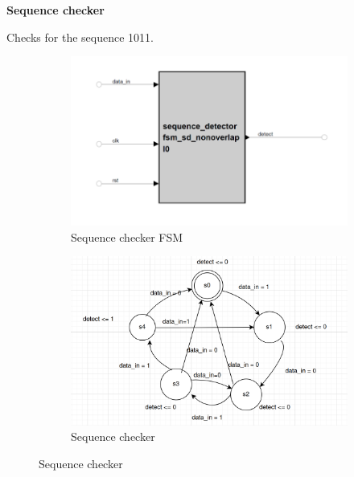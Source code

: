 \textbf{Sequence checker}

Checks for the sequence 1011.


\begin{figure}
	\centering

	\begin{subfigure}[b]{0.4\textwidth}
		\includegraphics[width=\textwidth]{images/sequence_detector.png}
		\caption{Sequence checker FSM}
	\end{subfigure}

	\begin{subfigure}[b]{0.4\textwidth}
		\includegraphics[width=\textwidth]{images/sequence_checker.png}
		\caption{Sequence checker}
	\end{subfigure}


\end{figure}

